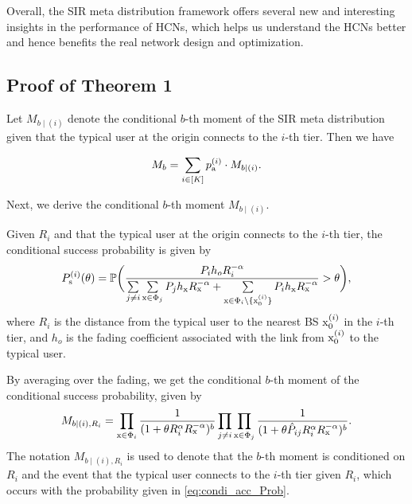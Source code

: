 \documentclass[12pt,draftclsnofoot,journal,onecolumn]{IEEEtran}
\def\P{\mathbb{P}}
\begin{document}
Overall, the SIR meta distribution framework offers several new and interesting insights in the performance of HCNs, which helps us understand the HCNs better and hence benefits the real network design and optimization.  

\appendix
\subsection{Proof of Theorem 1}
\begin{IEEEproof}
	Let $M_{b \mid (i)}$ denote the conditional $b$-th moment of the SIR meta distribution given that the typical user at the origin connects to the $i$-th tier. Then we have
	
	\begin{equation}
	\label{eq:Mb_tot_Prob}
	M_b = \sum\limits_{i\in[K]} p_{\rm a}^{(i)}\cdot M_{b \mid (i)}.
	\end{equation}  
	
	Next, we derive the conditional $b$-th moment $M_{b \mid (i)}$.
	
	Given $R_i$ and that the typical user at the origin connects to the $i$-th tier, the conditional success probability is given by 
	\begin{equation}	
	P_{{\rm s}}^{(i)}(\theta) = \P\bigg(\frac{P_i h_o R_i^{-\alpha}}{\sum\limits_{j\neq i} \sum\limits_{{\rm x}\in\Phi_j}P_j h_{{\rm x}}R_{{\rm x}}^{-\alpha}+\sum\limits_{{\rm x} \in \Phi_i\setminus\{{\rm x}_0^{(i)}\}} P_i h_{{\rm x}} R_{{\rm x}}^{-\alpha}} >\theta \bigg),
	\end{equation}
	where $R_i$ is the distance from the typical user to the nearest BS ${\rm x}_0^{(i)}$ in the $i$-th tier, and $h_o$ is the fading coefficient associated with the link from ${\rm x}_0^{(i)}$ to the typical user. 
	
	By averaging over the fading, we get the conditional $b$-th moment of the conditional success probability, given by
	\begin{equation}
	M_{b \mid (i),R_i} = \prod_{{\rm x} \in \Phi_i} \frac{1}{(1+\theta R_i^{\alpha}R_{{\rm x}}^{-\alpha})^b} \prod_{j\neq i}\prod_{{\rm x} \in\Phi_j}\frac{1}{(1+\theta {\hat P_{ij}} R_i^{\alpha} R_{{\rm x}}^{-\alpha})^b }.
	\end{equation}
	The notation $M_{b \mid (i),R_i}$ is used to denote that the $b$-th moment is conditioned on $R_i$ and the event that the typical user connects to the $i$-th tier given $R_i$, which occurs with the probability given in \eqref{eq:condi_acc_Prob}. 
	

\end{IEEEproof}
\end{document}
